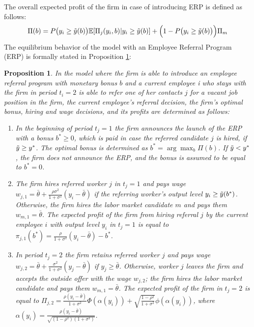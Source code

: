 \documentclass[12pt]{article}
\newtheorem{proposition}{Proposition}
\begin{document}
The overall expected profit of the firm in case of introducing ERP is defined as follows:
\begin{equation}\label{eq:profit_overal_erp}
    \Pi(b) = P\bigl(y_i \geq \Tilde{y}(b)\bigr) \mathbb{E}[\Pi_j(y_i, b)| y_i \geq \Tilde{y}(b)] + \Bigl(1-P\bigl(y_i \geq \Tilde{y}(b)\bigr)\Bigr)\Pi_m
\end{equation}
The equilibrium behavior of the model with an Employee Referral Program (ERP) is formally stated in Proposition \ref{prop:eq_erp}:
\begin{proposition}\label{prop:eq_erp}
    In the model where the firm is able to introduce an employee referral program with monetary bonus $b$ and a current employee i who stays with the firm in period $t_i = 2$ is able to refer one of her contacts $j$ for a vacant job position in the firm, the current employee’s referral decision, the firm’s optimal bonus, hiring and wage decisions, and its profits are determined as follows:
    \begin{enumerate}[label={\roman*})]
        \item In the beginning of period $t_j = 1$ the firm announces the launch of the ERP with a bonus $b^* \geq 0$, which is paid in case the referred candidate $j$ is hired, if $\Tilde{y} \geq y^*$. The optimal bonus is determined as $b^*=\arg\max_{b}\Pi(b)$. If $\Tilde{y} < y^*$, the firm does not announce the ERP, and the bonus is assumed to be equal to $b^* = 0$.
		\item The firm hires referred worker $j$ in $t_j = 1$ and pays wage $w_{j,1} = \bar{\theta}+\frac{\rho \sigma^2}{1+\sigma^2} \left(y_i - \bar{\theta}\right)$ if the referring worker's output level $y_i \geq \Tilde{y}(b^*)$. Otherwise, the firm hires the labor market candidate $m$ and pays them $w_{m,1} = \bar{\theta}$. The expected profit of the firm from hiring referral $j$ by the current employee $i$ with output level $y_i$ in $t_j = 1$ is equal to $\pi_{j,1}(b^*) = \frac{\rho}{1+\sigma^2}\left(y_i - \bar{\theta}\right)-b^*$.
        \item In period $t_j = 2$ the firm retains referred worker $j$ and pays wage $w_{j,2} = \bar{\theta} + \frac{\sigma^2}{1+\sigma^2}\left( y_j - \bar{\theta} \right)$ if $y_j \geq \bar{\theta}$. Otherwise, worker $j$ leaves the firm and accepts the outside offer with the wage $w_{j,2}$; the firm hires the labor market candidate and pays them $w_{m,1} = \bar{\theta}$. The expected profit of the firm in $t_j = 2$ is equal to $\Pi_{j,2} = \frac{\rho\left(y_i-\bar{\theta}\right)}{1+\sigma^2}\Phi(\alpha(y_i))
        +\sqrt{\frac{1-\rho^2}{1+\sigma^2}}\phi(\alpha(y_i))$, where $\alpha (y_i) = \frac{\rho\left(y_i - \bar{\theta}\right)}{\sqrt{(1-\rho^2)(1+\sigma^2)}}$.
	\end{enumerate}
\end{proposition}
\end{document}
